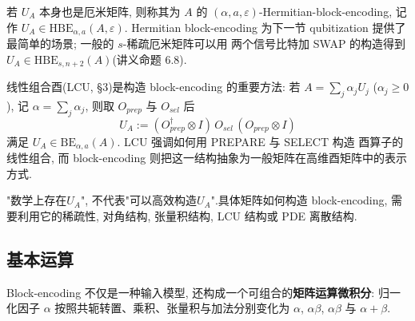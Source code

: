 \documentclass[utf8]{article} %
\numberwithin{equation}{section}   %
\newtheorem{Def}{\hskip 2em {\color{green} 定义}}[subsection]
\newtheorem{Note}{\hskip 2em {\color{red} 注}}[subsection]
\begin{document}
\begin{Def}
    若 $U_A$ 本身也是厄米矩阵, 则称其为 $A$ 的 $(\alpha,a,\varepsilon)$-Hermitian-block-encoding,
    记作 $U_A \in \mathrm{HBE}_{\alpha,a}(A,\varepsilon)$. Hermitian block-encoding
    为下一节 qubitization 提供了最简单的场景; 一般的 $s$-稀疏厄米矩阵可以用
    两个信号比特加 SWAP 的构造得到 $U_A \in \mathrm{HBE}_{s,n+2}(A)$(讲义命题 6.8).
\end{Def}

\begin{Note}
    线性组合酉(LCU, §3)是构造 block-encoding 的重要方法: 若 $A = \sum_j \alpha_j U_j$
    ($\alpha_j \ge 0$), 记 $\alpha = \sum_j \alpha_j$, 则取 $O_{prep}$ 与 $O_{sel}$ 后
    \begin{equation}
        U_A := (O_{prep}^\dagger \otimes I)\, O_{sel}\, (O_{prep} \otimes I)
    \end{equation}
    满足 $U_A \in \mathrm{BE}_{\alpha,a}(A)$. LCU 强调如何用 PREPARE 与 SELECT 构造
    酉算子的线性组合, 而 block-encoding 则把这一结构抽象为一般矩阵在高维酉矩阵中的表示方式.
\end{Note}

\begin{Note}
    "数学上存在$U_A$", 不代表"可以高效构造$U_A$".具体矩阵如何构造 block-encoding, 需要利用它的稀疏性, 对角结构, 张量积结构, LCU 结构或 PDE 离散结构.
\end{Note}

\subsection{基本运算}

Block-encoding 不仅是一种输入模型, 还构成一个可组合的\textbf{矩阵运算微积分}:
归一化因子 $\alpha$ 按照共轭转置、乘积、张量积与加法分别变化为
$\alpha$, $\alpha\beta$, $\alpha\beta$ 与 $\alpha + \beta$.
\end{document}
